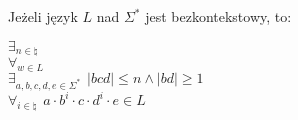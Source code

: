 \begin{theorem}
    Jeżeli język $L$ nad $\Sigma^*$ jest bezkontekstowy, to: 
    
    \( \exists_{n \in \natural} \) \\
    \( \forall_{w \in L} \) \\
    \( \exists_{a, b, c, d, e \in \Sigma^*} \hspace{5pt} |bcd| \leq n \wedge |bd| \geq 1 \) \\
    \( \forall_{i \in \natural} \hspace{5pt} a \cdot b^{i} \cdot c \cdot d^{i} \cdot e \in L\)
\end{theorem}